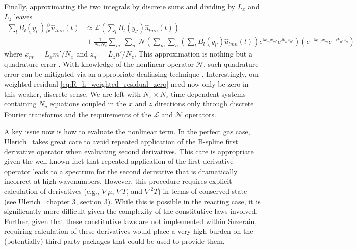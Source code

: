 Finally, approximating the two integrals by discrete sums and dividing
by $L_x$ and $L_z$ leaves
\begin{align}
  \sum_{l} B_l\!\left(y_{l'}\right)
  \frac{\partial}{\partial{}t} \hat{u}_{l m n}(t)
  &\approx
  \mathscr{L}\left(
    \sum_{l}
     B_l\!\left(y_{l'}\right)
    \hat{u}_{l m n}(t)
  \right)
\\
  &{}+
  \frac{1}{N_x N_z}
  \sum_{m'} \sum_{n'}
  \mathscr{N}\left(
    \sum_{m}
    \sum_{n}
    \left(
      \sum_{l} B_l\!\left(y_{l'}\right)
      \hat{u}_{l m n}(t)
    \right)
    e^{\ii k_m x_{m'}}e^{\ii k_n z_{n'}}
  \right)
  \!\!
  \left(
    e^{-\ii k_{m'} x_m}e^{-\ii k_{n'} z_n}
  \right)
  \label{eq:spatial_discretization}
\end{align}
where $x_{m'}=L_x m' / N_x$ and $z_{n'}=L_z n' / N_z$.  This approximation is
nothing but a quadrature error \citep[see][theorem~19]{Boyd2001}.  With
knowledge of the nonlinear operator $\mathscr{N}$, such quadrature error can be
mitigated via an appropriate dealiasing technique \citep[see][]{Canuto2006}.
Interestingly, our weighted residual \eqref{eq:R_h_weighted_residual_zero} need
now only be zero in this weaker, discrete sense.  We are left with
$N_x\times{}N_z$ time-dependent systems containing $N_y$ equations coupled in
the $x$ and $z$ directions only through discrete Fourier transforms and the
requirements of the $\mathscr{L}$ and $\mathscr{N}$ operators.

A key issue now is how to evaluate the nonlinear term.  In the perfect
gas case, Ulerich~\cite{?} takes great care to avoid repeated
application of the B-spline first derivative operator when evaluating
second derivatives.  This care is appropriate given the well-known
fact that repeated application of the first derivative operator leads
to a spectrum for the second derivative that is dramatically incorrect
at high wavenumbers.  However, this procedure requires explicit
calculation of derivatives (e.g., $\nabla \mu$, $\nabla T$, and
$\nabla^2 T$) in terms of conserved state (see Ulerich~\cite{} chapter
3, section 3).  While this is possible in the reacting case, it is
significantly more difficult given the complexity of the constitutive
laws involved.  Further, given that these constitutive laws are not
implemented within Suzerain, requiring calculation of these
derivatives would place a very high burden on the (potentially)
third-party packages that could be used to provide them.

